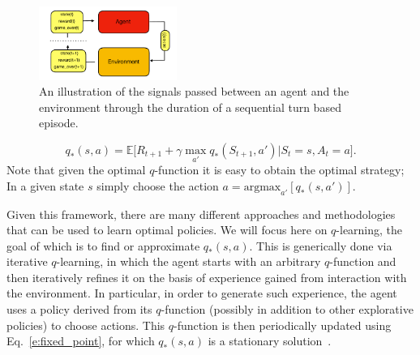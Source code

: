 \documentclass[twocolumn,preprintnumbers,amsmath,amssymb,notitlepage,nofootinbib,longbibliography,superscriptaddress,aps,pra,10pt]{revtex4-1}
\begin{document}
	\begin{figure}
		\centering
		\includegraphics[width=0.4\textwidth]{figures/agent_environment.pdf}
		\caption{
			An illustration of the signals passed between an agent and the environment through the duration of a sequential turn based episode.
		}
		\label{f:agent_environment}
	\end{figure}

	\begin{equation}\label{e:fixed_point}
		q_*(s,a) = \mathbb{E}\big[R_{t+1} + \gamma\max_{a'}q_{*}(S_{t+1},a')\big|S_t = s, A_t = a \big].
	\end{equation}
	Note that given the optimal $q$-function it is easy to obtain the optimal strategy; In a given state $s$ simply choose the action $a = \mathrm{argmax}_{a'}[q_*(s,a')]$.

	Given this framework, there are many different approaches and methodologies that can be used to learn optimal policies.
	We will focus here on $q$-learning, the goal of which is to find or approximate $q_*(s,a)$.
	This is generically done via iterative $q$-learning, in which the agent starts with an arbitrary $q$-function and then iteratively refines it on the basis of experience gained from interaction with the environment.
	In particular, in order to generate such experience, the agent uses a policy derived from its $q$-function (possibly in addition to other explorative policies) to choose actions.
	This $q$-function is then periodically updated using Eq.~\eqref{e:fixed_point}, for which $q_*(s,a)$ is a stationary solution~\cite{RLSutton18}.
\end{document}
